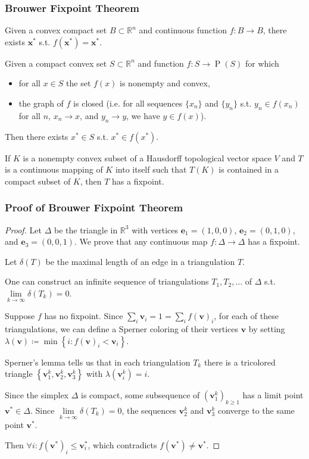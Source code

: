 \documentclass[UTF8,aspectratio=43,11pt,colorlinks,compress,openany]{beamer}%
\begin{document}
\begin{frame}\frametitle{Brouwer Fixpoint Theorem}
\begin{theorem}
Given a convex compact set $B\subset\mathbb{R}^n$ and continuous function $f: B\to B$, there exists $\mathbf{x}^*$ s.t. $f(\mathbf{x}^*)=\mathbf{x}^*$.
\end{theorem}
\begin{theorem}
Given a compact convex set $S\subset\mathbb{R}^n$ and function $f: S\to \operatorname{P}(S)$ for which
\begin{itemize}
	\item for all $x\in S$ the set $f(x)$ is nonempty and convex,
	\item the graph of $f$ is closed (i.e. for all sequences $\{x_n\}$ and $\{y_n\}$ s.t. $y_n\in f(x_n)$ for all $n$, $x_n\to x$, and $y_n\to y$, we have $y\in f(x)$).
\end{itemize}
Then there exists $x^*\in S$ s.t. $x^*\in f(x^*)$.
\end{theorem}
\begin{theorem}
If $K$ is a nonempty convex subset of a Hausdorff topological vector space $V$ and $T$ is a continuous mapping of $K$ into itself such that $T(K)$ is contained in a compact subset of $K$, then $T$ has a fixpoint.
\end{theorem}
\end{frame}

\begin{frame}\frametitle{Proof of Brouwer Fixpoint Theorem}
\begin{proof}
Let $\Delta$ be the triangle in $\mathbb{R}^3$ with vertices $\mathbf{e}_1=(1, 0, 0)$, $\mathbf{e}_2=(0, 1, 0)$, and $\mathbf{e}_3=(0, 0, 1)$. We prove that any continuous map $f:\Delta\to\Delta$ has a fixpoint.

Let $\delta(T)$ be the maximal length of an edge in a triangulation $T$.

One can construct an infinite sequence of triangulations $T_1, T_2,\dots$ of $\Delta$ s.t. $\lim\limits_{k\to\infty}\delta(T_k)=0$.

Suppose $f$ has no fixpoint. Since $\sum_i \mathbf{v}_i=1=\sum_i f(\mathbf{v})_i$, for each of these triangulations, we can define a Sperner coloring of their vertices $\mathbf{v}$ by setting $\lambda(\mathbf{v})\coloneqq \min\left\{i: f(\mathbf{v})_i<\mathbf{v}_i\right\}$.

Sperner's lemma tells us that in each triangulation $T_k$ there is a tricolored triangle $\left\{\mathbf{v}_1^k,\mathbf{v}_2^k,\mathbf{v}_3^k\right\}$ with $\lambda(\mathbf{v}_i^k)=i$.

Since the simplex $\Delta$ is compact, some subsequence of $\left(\mathbf{v}_1^k\right)_{k\geq 1}$ has a limit point $\mathbf{v}^*\in\Delta$. Since $\lim\limits_{k\to\infty}\delta(T_k)=0$, the sequences $\mathbf{v}_2^k$ and $\mathbf{v}_3^k$ converge to the same point $\mathbf{v}^*$.

Then $\forall i: f(\mathbf{v}^*)_i\leq\mathbf{v}^*_i$, which contradicts $f(\mathbf{v}^*)\neq\mathbf{v}^*$.
\end{proof}
\end{frame}
\end{document}

